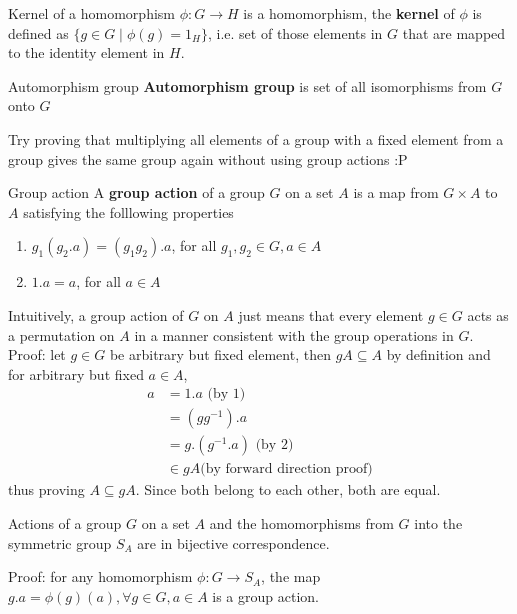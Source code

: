 \documentclass[titlepage, 12pt]{article}
\begin{document}
\begin{definition}{Kernel of a homomorphism}{}
$\phi:G\rightarrow H$ is a homomorphism, the \textbf{kernel} of $\phi$ is
defined as $\{g\in G\mid\phi(g) = 1_H\}$, i.e. set of those elements in $G$ that
are mapped to the identity element in $H$.
\end{definition}

\begin{definition}{Automorphism group}{}
\textbf{Automorphism group} is set of all isomorphisms from $G$ onto $G$
\end{definition}

Try proving that multiplying all elements of a group with a fixed element from a
group gives the same group again without using group actions :P
\begin{definition}{Group action}{}
A \textbf{group action} of a group $G$ on a set $A$ is a
map from $G\times A$ to $A$ satisfying the folllowing properties
\begin{enumerate}

    \item $g_1(g_2.a) = (g_1g_2).a$, for all $g_1, g_2\in G, a\in A$

    \item $1.a = a$, for all $a\in A$

\end{enumerate}
\end{definition}

Intuitively, a group action of $G$ on $A$ just means that every element $g\in G$
acts as a permutation on $A$ in a manner consistent with the group operations in
$G$. Proof: let $g\in G$ be arbitrary but fixed element, then $gA\subseteq
A$ by definition and for arbitrary but fixed $a\in A$,
\begin{align*}
    a &= 1 . a \textrm{ (by 1)}\\
      &= (gg^{-1}) . a\\
      &= g . (g^{-1} . a) \textrm{ (by 2)}\\
      &\in gA  \textrm{(by forward direction proof)}
\end{align*}
thus proving $A\subseteq gA$. Since both belong to each other, both are equal.

\begin{proposition}{}{}
Actions of a group $G$ on a set $A$ and the homomorphisms from $G$ into the
symmetric group $S_A$ are in bijective correspondence.
\end{proposition}
Proof: for any homomorphism $\phi: G\rightarrow S_A$, the map $g . a =
\phi(g)(a), \forall g\in G, a\in A$ is a group action.
\end{document}
